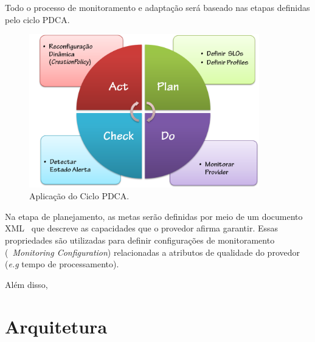 Todo o processo de monitoramento e adaptação será baseado nas etapas definidas pelo ciclo PDCA. 

\begin{figure}[htp]
\centering
\includegraphics[width=10cm]{chapters/chapter4/pdca_actions.png}
\caption[Aplicação do Ciclo PDCA]{Aplicação do Ciclo PDCA.}
\label{fig:pdcamapping}
\end{figure}


Na etapa de planejamento, as metas serão definidas por meio de um documento XML~\cite{xml} que descreve as capacidades que o provedor afirma garantir. Essas propriedades são utilizadas para definir configurações de monitoramento (~\textit{Monitoring Configuration}) relacionadas a atributos de qualidade do provedor (\textit{e.g} tempo de processamento).

Além disso, 

\section{Arquitetura}
